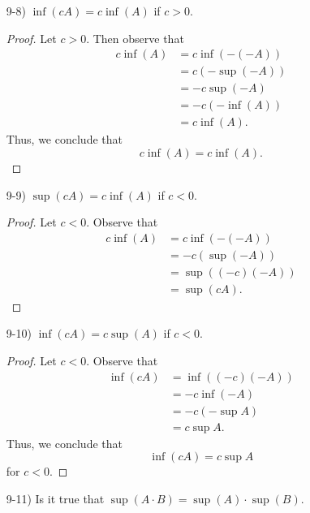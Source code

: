 \documentclass[11pt,a4paper]{article}
\begin{document}
\begin{enumerate}
\begin{enumerate}
\begin{proof}
               \end{proof} 
        \item[9-8)] \( \inf(cA) = c \inf (A)  \) if \( c > 0  \).
            \begin{proof}
            Let \( c > 0  \). Then observe that 
            \begin{align*}
                c \inf (A) &= c \inf (- (-A)) \\
                           &= c (- \sup(-A)) \tag{9-4)} \\
                           &= -c \sup(-A) \\
                           &= -c (- \inf(A)) \tag{9-3)} \\
                           &= c \inf (A).
            \end{align*}
            Thus, we conclude that 
            \[  c \inf(A) = c \inf(A). \]
            \end{proof}
        \item[9-9)] \( \sup(cA) = c \inf(A) \) if \( c < 0  \).
            \begin{proof}
            Let \( c < 0  \). Observe that 
            \begin{align*}
                c \inf(A) &= c \inf(- (-A))  \\
                          &= -c (\sup(-A)) \tag{9-4)}  \\
                          &= \sup((-c)(-A)) \tag{\( -c > 0  \) and 9-7)} \\
                          &= \sup(cA).
            \end{align*}
            \end{proof}
        \item[9-10)] \( \inf(cA) = c \sup (A) \) if \( c < 0  \).
            \begin{proof}
            Let \( c  < 0  \). Observe that 
            \begin{align*}
                \inf (cA) &= \inf ((-c)(-A)) \tag{\( -c > 0 \)} \\
                          &= -c \inf(-A) \tag{9-8)} \\
                          &= -c (- \sup A ) \tag{9-4)} \\ 
                          &= c \sup A. 
            \end{align*}
            Thus, we conclude that 
            \[  \inf(cA) = c \sup A  \]
            for \( c < 0  \).
            \end{proof}
        \item[9-11)] Is it true that \( \sup(A \cdot B) = \sup(A) \cdot \sup(B) \).

\end{enumerate}
\end{enumerate}
\end{document}
